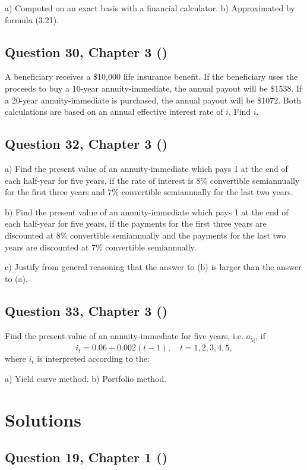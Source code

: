 \documentclass[12pt, a4paper]{article}
\begin{document}
a) Computed on an exact basis with a financial calculator.  
b) Approximated by formula (3.21).

\subsection*{Question 30, Chapter 3  (\cite{toi3rd})}
A beneficiary receives a \$10,000 life insurance benefit. 
If the beneficiary uses the proceeds to buy a 10-year annuity-immediate, the annual payout will be \$1538. 
If a 20-year annuity-immediate is purchased, the annual payout will be \$1072. 
Both calculations are based on an annual effective interest rate of $i$. 
Find $i$.

\subsection*{Question 32, Chapter 3  (\cite{toi3rd})}
a) Find the present value of an annuity-immediate which pays 1 at the end of each half-year for five years, if the rate of interest is 8\% convertible semiannually for the first three years and 7\% convertible semiannually for the last two years.  

b) Find the present value of an annuity-immediate which pays 1 at the end of each half-year for five years, if the payments for the first three years are discounted at 8\% convertible semiannually and the payments for the last two years are discounted at 7\% convertible semiannually.  

c) Justify from general reasoning that the answer to (b) is larger than the answer to (a).

\subsection*{Question 33, Chapter 3  (\cite{toi3rd})}
Find the present value of an annuity-immediate for five years, i.e. $a_{\overline{5}|}$, if  
\[
i_t = 0.06 + 0.002(t-1), \quad t=1,2,3,4,5,
\]  
where $i_t$ is interpreted according to the:  

a) Yield curve method.  
b) Portfolio method.

\newpage

\section*{Solutions}

\subsection*{Question 19, Chapter 1  (\cite{toi3rd})}
\end{document}
